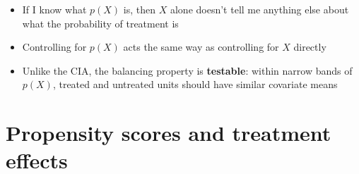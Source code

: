 \documentclass[compress, 8pt]{beamer}
\begin{document}
\begin{frame}{}

\begin{figure}
\end{figure}
\begin{itemize}
    \item If I know what $p(X)$ is, then $X$ alone doesn't tell me anything else about what the probability of treatment is
    \item Controlling for $p(X)$ acts the same way as controlling for $X$ directly
    \item Unlike the CIA, the balancing property is \textbf{testable}: within narrow bands of $p(X)$, treated and untreated units should have similar covariate means
\end{itemize}

\end{frame}

\section[Treatment effects]{Propensity scores and treatment effects}
\miniframesoff
\begin{frame}
    \tableofcontents[currentsection]
\end{frame}
\miniframeson
\end{document}

